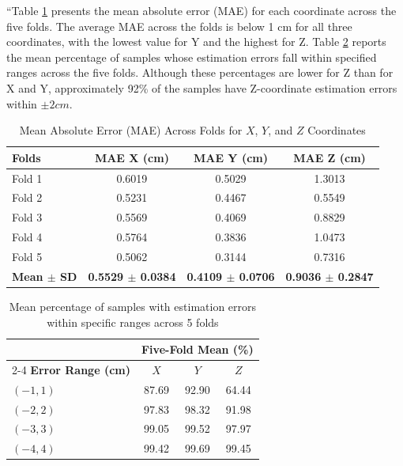 \documentclass[conference]{IEEEtran}
\begin{document}
“Table \ref{tab:mae_xyz_folds} presents the mean absolute error (MAE) for each coordinate across the five folds. The average MAE across the folds is below 1 cm for all three coordinates, with the lowest value for Y and the highest for Z. Table \ref{tab:mean_error_distribution_xyz} reports the mean percentage of samples whose estimation errors fall within specified ranges across the five folds. Although these percentages are lower for Z than for X and Y, approximately 92\% of the samples have Z-coordinate estimation errors within $\pm 2 cm$.

\begin{table}[htbp]
  \centering
  \caption{Mean Absolute Error (MAE) Across Folds for $X$, $Y$, and $Z$ Coordinates}
  \label{tab:mae_xyz_folds}
  \vspace{0.25cm}
    \footnotesize
  \begin{tabular}{lccc}
    \toprule
    \textbf{Folds} & \textbf{MAE X (cm)} & \textbf{MAE Y (cm)} & \textbf{MAE Z (cm)} \\
    \midrule
    Fold 1 & 0.6019 & 0.5029 & 1.3013 \\
    Fold 2 & 0.5231 & 0.4467 & 0.5549 \\
    Fold 3 & 0.5569 & 0.4069 & 0.8829 \\
    Fold 4 & 0.5764 & 0.3836 & 1.0473 \\
    Fold 5 & 0.5062 & 0.3144 & 0.7316 \\
    \midrule
    \textbf{Mean $\pm$ SD} & \textbf{0.5529 $\pm$ 0.0384} & \textbf{0.4109 $\pm$ 0.0706} & \textbf{0.9036 $\pm$ 0.2847} \\
    \bottomrule
  \end{tabular}
\end{table}

\begin{table}[htbp]
  \centering
  \caption{Mean percentage of samples with estimation errors within specific ranges across 5 folds}
  \label{tab:mean_error_distribution_xyz}
  \vspace{0.25cm}
  \begin{tabular}{lccc}
    \toprule
    & \multicolumn{3}{c}{\textbf{Five-Fold Mean (\%)}} \\
    \cmidrule(lr){2-4}
    \textbf{Error Range (cm)} & \textbf{$X$} & \textbf{$Y$} & \textbf{$Z$} \\
    \midrule
    $(-1, 1)$ & 87.69 & 92.90 & 64.44 \\
    $(-2, 2)$ & 97.83 & 98.32 & 91.98 \\
    $(-3, 3)$ & 99.05 & 99.52 & 97.97 \\
    $(-4, 4)$ & 99.42 & 99.69 & 99.45 \\
    \bottomrule
  \end{tabular}
\end{table}
\end{document}
